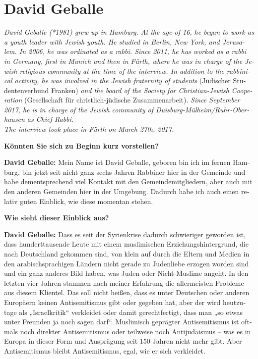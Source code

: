 \section{David Geballe} 
\begin{otherlanguage}{ngerman}
\textit{David Geballe (*1981) grew up in Hamburg. At the age of 16, he began to work as a youth leader with Jewish youth. He studied in Berlin, New York, and Jerusalem. In 2006, he was ordinated as a rabbi. Since 2011, he has worked as a rabbi in Germany, first in Munich and then in Fürth, where he was in charge of the Jewish religious community at the time of the interview. In addition to the rabbinical activity, he was involved in the Jewish fraternity of students} (Jüdischer Studentenverbund Franken) \textit{and the board of the Society for Christian-Jewish Cooperation} (Gesellschaft für christlich-jüdische Zusammenarbeit). \textit{Since September 2017, he is in charge of the Jewish community of Duisburg-Mülheim/Ruhr-Oberhausen as Chief Rabbi.\\
The interview took place in Fürth on March 27th, 2017.}\par
\vspace*{2em}
\textbf{Könnten Sie sich zu Beginn kurz vorstellen?} 

\textbf{David Geballe:} Mein Name ist David Geballe, geboren bin ich im fernen Hamburg, bin jetzt seit nicht ganz sechs Jahren Rabbiner hier in der Gemeinde und habe dementsprechend viel Kontakt mit den Gemeindemitgliedern, aber auch mit den anderen Gemeinden hier in der Umgebung. Dadurch habe ich auch einen relativ guten Einblick, wie diese momentan stehen. 

\textbf{Wie sieht dieser Einblick aus?} 

\textbf{David Geballe:} Dass es seit der Syrienkrise dadurch schwieriger geworden ist, dass hunderttausende Leute mit einem muslimischen Erziehungshintergrund, die nach Deutschland gekommen sind, von klein auf durch die Eltern und Medien in den arabischsprachigen Ländern nicht gerade zu Judenliebe erzogen worden sind und ein ganz anderes Bild haben, was Juden oder Nicht-Muslime angeht. In den letzten vier Jahren stammen nach meiner Erfahrung die allermeisten Probleme aus diesem Klientel. Das soll nicht heißen, dass es unter Deutschen oder anderen Europäern keinen Antisemitismus gibt oder gegeben hat, aber der wird heutzutage als „Israelkritik“ verkleidet oder damit gerechtfertigt, dass man „so etwas unter Freunden ja noch sagen darf“. Muslimisch geprägter Antisemitismus ist oftmals noch direkter Antisemitismus oder teilweise noch Antijudaismus – was es in Europa in dieser Form und Ausprägung seit 150 Jahren nicht mehr gibt. Aber Antisemitismus bleibt Antisemitismus, egal, wie er sich verkleidet. 


\end{otherlanguage}
